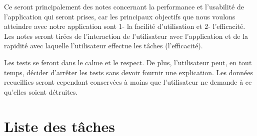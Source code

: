 \documentclass[letterpaper, oneside, 12pt, these, creativecommons]{thETS}
\begin{document}
Ce seront principalement des notes concernant la performance et l'usabilité de l'application qui seront prises, car les principaux objectifs que nous voulons atteindre avec notre application sont 1- la facilité d'utilisation et 2- l'efficacité. Les notes seront tirées de l'interaction de l'utilisateur avec l'application et de la rapidité avec laquelle l'utilisateur effectue les tâches (l'efficacité).

Les tests se feront dans le calme et le respect. De plus, l'utilisateur peut, en tout temps, décider d'arrêter les tests sans devoir fournir une explication. Les données recueillies seront cependant conservées à moins que l'utilisateur ne demande à ce qu'elles soient détruites.

\newpage

\section{Liste des tâches}
\end{document}
